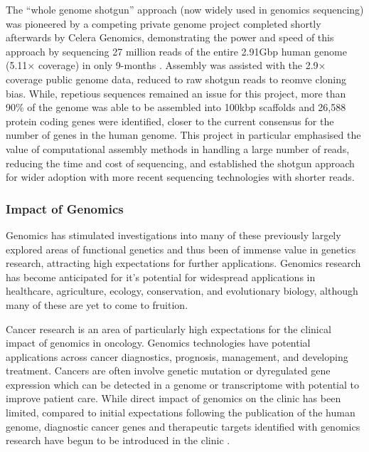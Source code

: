 
The ``whole genome shotgun'' approach (now widely used in genomics sequencing) was pioneered by a competing private genome project completed shortly afterwards by Celera Genomics, demonstrating the power and speed of this approach by sequencing 27 million reads of the entire 2.91Gbp human genome (5.11$\times$ coverage) in only 9-months \citep{Venter2001}. Assembly was assisted with the 2.9$\times$ coverage public genome data, reduced to raw shotgun reads to reomve cloning bias. While, repetious sequences remained an issue for this project, more than 90\% of the genome was able to be assembled into 100kbp scaffolds and 26,588 protein coding genes were identified, closer to the current consensus for the number of genes in the human genome. This project in particular emphasised the value of computational assembly methods in handling a large number of reads, reducing the time and cost of sequencing, and established the shotgun approach for wider adoption with more recent sequencing technologies with shorter reads.

\subsubsection{Impact of Genomics}
Genomics has stimulated investigations into many of these previously largely explored areas of functional genetics and thus been of immense value in genetics research, attracting high expectations for further applications. Genomics research has become anticipated for it's potential for widespread applications in healthcare, agriculture, ecology, conservation, and evolutionary biology, although many of these are yet to come to fruition.

Cancer research is an area of particularly high expectations for the clinical impact of genomics in oncology. Genomics technologies have potential applications across cancer diagnostics, prognosis, management, and developing treatment. Cancers are often involve genetic mutation or dyregulated gene expression which can be detected in a genome or transcriptome with potential to improve patient care. While direct impact of genomics on the clinic has been limited, compared to initial expectations following the publication of the human genome, diagnostic cancer genes and therapeutic targets identified with genomics research have begun to be introduced in the clinic \citep{Stratton2009}.

